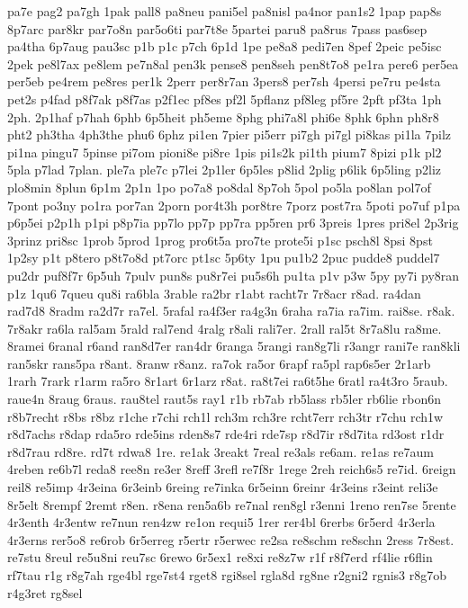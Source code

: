 {pa7e
pag2
pa7gh
1pak
pall8
pa8neu
pani5el
pa8nisl
pa4nor
pan1s2
1pap
pap8s
8p7arc
par8kr
par7o8n
par5o6ti
par7t8e
5partei
paru8
pa8rus
7pass
pas6sep
pa4tha
6p7aug
pau3sc
p1b
p1c
p7ch
6p1d
1pe
pe8a8
pedi7en
8pef
2peic
pe5isc
2pek
pe8l7ax
pe8lem
pe7n8al
pen3k
pense8
pen8seh
pen8t7o8
pe1ra
pere6
per5ea
per5eb
pe4rem
pe8res
per1k
2perr
per8r7an
3pers8
per7sh
4persi
pe7ru
pe4sta
pet2s
p4fad
p8f7ak
p8f7as
p2f1ec
pf8es
pf2l
5pflanz
pf8leg
pf5re
2pft
pf3ta
1ph
2ph.
2p1haf
p7hah
6phb
6p5heit
ph5eme
8phg
phi7a8l
phi6e
8phk
6phn
ph8r8
pht2
ph3tha
4ph3the
phu6
6phz
pi1en
7pier
pi5err
pi7gh
pi7gl
pi8kas
pi1la
7pilz
pi1na
pingu7
5pinse
pi7om
pioni8e
pi8re
1pis
pi1s2k
pi1th
pium7
8pizi
p1k
pl2
5pla
p7lad
7plan.
ple7a
ple7c
p7lei
2p1ler
6p5les
p8lid
2plig
p6lik
6p5ling
p2liz
plo8min
8plun
6p1m
2p1n
1po
po7a8
po8dal
8p7oh
5pol
po5la
po8lan
pol7of
7pont
po3ny
po1ra
por7an
2porn
por4t3h
por8tre
7porz
post7ra
5poti
po7uf
p1pa
p6p5ei
p2p1h
p1pi
p8p7ia
pp7lo
pp7p
pp7ra
pp5ren
pr6
3preis
1pres
pri8el
2p3rig
3prinz
pri8sc
1prob
5prod
1prog
pro6t5a
pro7te
prote5i
p1sc
psch8l
8psi
8pst
1p2sy
p1t
p8tero
p8t7o8d
pt7orc
pt1sc
5p6ty
1pu
pu1b2
2puc
pudde8
puddel7
pu2dr
puf8f7r
6p5uh
7pulv
pun8s
pu8r7ei
pu5s6h
pu1ta
p1v
p3w
5py
py7i
py8ran
p1z
1qu6
7queu
qu8i
ra6bla
3rable
ra2br
r1abt
racht7r
7r8acr
r8ad.
ra4dan
rad7d8
8radm
ra2d7r
ra7el.
5rafal
ra4f3er
ra4g3n
6raha
ra7ia
ra7im.
rai8se.
r8ak.
7r8akr
ra6la
ral5am
5rald
ral7end
4ralg
r8ali
rali7er.
2rall
ral5t
8r7a8lu
ra8me.
8ramei
6ranal
r6and
ran8d7er
ran4dr
6ranga
5rangi
ran8g7li
r3angr
rani7e
ran8kli
ran5skr
rans5pa
r8ant.
8ranw
r8anz.
ra7ok
ra5or
6rapf
ra5pl
rap6s5er
2r1arb
1rarh
7rark
r1arm
ra5ro
8r1art
6r1arz
r8at.
ra8t7ei
ra6t5he
6ratl
ra4t3ro
5raub.
raue4n
8raug
6raus.
rau8tel
raut5s
ray1
r1b
rb7ab
rb5lass
rb5ler
rb6lie
rbon6n
r8b7recht
r8bs
r8bz
r1che
r7chi
rch1l
rch3m
rch3re
rcht7err
rch3tr
r7chu
rch1w
r8d7achs
r8dap
rda5ro
rde5ins
rden8s7
rde4ri
rde7sp
r8d7ir
r8d7ita
rd3ost
r1dr
r8d7rau
rd8re.
rd7t
rdwa8
1re.
re1ak
3reakt
7real
re3als
re6am.
re1as
re7aum
4reben
re6b7l
reda8
ree8n
re3er
8reff
3refl
re7f8r
1rege
2reh
reich6s5
re7id.
6reign
reil8
re5imp
4r3eina
6r3einb
6reing
re7inka
6r5einn
6reinr
4r3eins
r3eint
reli3e
8r5elt
8rempf
2remt
r8en.
r8ena
ren5a6b
re7nal
ren8gl
r3enni
1reno
ren7se
5rente
4r3enth
4r3entw
re7nun
ren4zw
re1on
requi5
1rer
rer4bl
6rerbs
6r5erd
4r3erla
4r3erns
rer5o8
re6rob
6r5erreg
r5ertr
r5erwec
re2sa
re8schm
re8schn
2ress
7r8est.
re7stu
8reul
re5u8ni
reu7sc
6rewo
6r5ex1
re8xi
re8z7w
r1f
r8f7erd
rf4lie
r6flin
rf7tau
r1g
r8g7ah
rge4bl
rge7st4
rget8
rgi8sel
rgla8d
rg8ne
r2gni2
rgnis3
r8g7ob
r4g3ret
rg8sel
}
